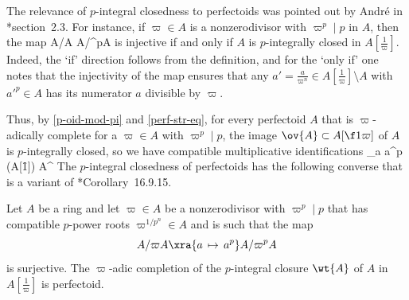 The relevance of $p$-integral closedness to perfectoids was pointed out by Andr\'{e} in \cite{And18a}*{section~2.3}. For instance, %
if $\varpi \in A$ is a nonzerodivisor with $\varpi^p \mid p$ in $A$, then the map %
\be \label{p-int-cl-lem}
\tst A/\varpi A  A/\varpi^pA
\ee
is injective if and only if $A$ is $p$-integrally closed in $A[\frac 1\varpi]$.
Indeed, the `if' direction follows from the definition, and for the `only if' one notes that the injectivity of the map ensures that any $a'=\frac{a}{\varpi^n}\in A[\frac 1\varpi] \setminus A$ with $a'^p \in A$ has its numerator $a$ divisible by $\varpi$. %

Thus, by \eqref{p-oid-mod-pi} and \eqref{perf-str-eq}, for every perfectoid $A$ that is $\varpi$-adically complete for a %
$\varpi \in A$ with $\varpi^p \mid p$, the image $\ov{A} \subset A[\f 1\varpi]$ of $A$ is $p$-integrally closed, %
so we have compatible multiplicative identifications %
\be \label{monoid-id-pi}
\tst \varprojlim_{a \mapsto a^p} (A[\f 1{\varpi}]) \isomto A^  
\ee
The $p$-integral closedness of perfectoids has the following converse that is a variant of \cite{GR18}*{Corollary~16.9.15}.
\epp







\bprop \label{p-oid-rec}
Let $A$ be a ring and let $\varpi \in A$ be a nonzerodivisor with $\varpi^p \mid p$ that has compatible $p$-power roots $\varpi^{1/p^n} \in A$ and is such that the map
\[
A/\varpi A \xra{a\, \mapsto\, a^p} A/\varpi^pA
\]
is surjective. The $\varpi$-adic completion of the $p$-integral closure $\wt{A}$ of $A$ in $A[\frac 1\varpi]$ is perfectoid.
\eprop

